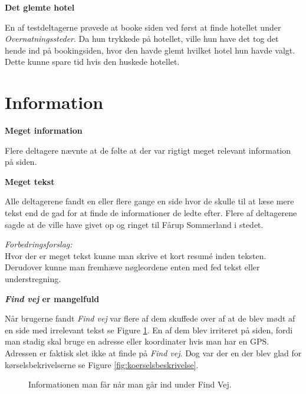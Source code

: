 \documentclass[10pt,a4paper]{article}      %
\newenvironment{forslag}{\emph{Forbedringsforslag:}\\[0.5mm]}{}
\newcommand\pic[1]{\texttt{[image: Pics/\#1]}}
\renewcommand\good{\pic{good}}
\renewcommand\goodidea{\pic{goodidea}}
\renewcommand\smallproblem{\pic{smallproblem}}
\renewcommand\seriousproblem{\pic{seriousproblem}}
\begin{document}
\begin{kommentarer}
\item[\goodidea] \textbf{Det glemte hotel}

En af testdeltagerne prøvede at booke siden ved først at finde hotellet under
\emph{Overnatningssteder}. Da hun trykkede på hotellet, ville hun have det tog det hende
ind på bookingsiden, hvor den havde glemt hvilket hotel hun havde valgt. Dette
kunne spare tid hvis den huskede hotellet.

\end{kommentarer}


\section{Information}

\begin{kommentarer}


\item[\good] \textbf{Meget information}

Flere deltagere nævnte at de følte at der var rigtigt meget relevant information på siden.

\item[\seriousproblem] \textbf{Meget tekst}

Alle deltagerene fandt en eller flere gange en side hvor de skulle til at læse
mere tekst end de gad for at finde de informationer de ledte efter. Flere af
deltagerene sagde at de ville have givet op og ringet til Fårup Sommerland i
stedet.

\begin{forslag}
Hvor der er meget tekst kunne man skrive et kort resumé inden teksten. Derudover kunne man fremhæve nøgleordene enten med fed tekst eller understregning. 
\end{forslag}

\item[\smallproblem] \textbf{\emph{Find vej} er mangelfuld}

Når brugerne fandt \emph{Find vej} var flere af dem skuffede over af at de
blev mødt af en side med irrelevant tekst se Figure \ref{fig:findvej}. En af
dem blev irriteret på siden, fordi man stadig skal bruge en adresse eller
koordinater hvis man har en GPS. Adressen er faktisk slet ikke at finde på 
\emph{Find vej}. Dog var der en der blev glad for kørselsbekrivelserne se
Figure \ref{fig:koerselsbeskrivelse}.

\begin{figure}[htbp]
    \centering
    \caption{Informationen man får når man går ind under Find Vej.}
    \label{fig:findvej}
\end{figure}


\end{kommentarer}
\end{document}
